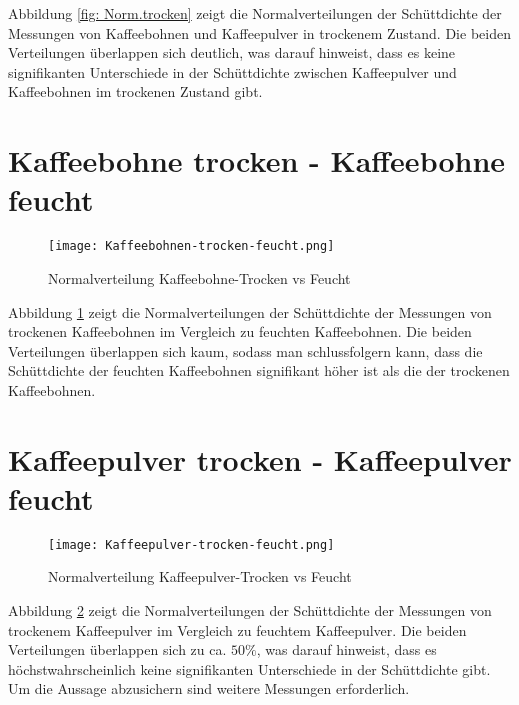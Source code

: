    Abbildung \ref{fig: Norm.trocken} zeigt die Normalverteilungen der Schüttdichte der Messungen von Kaffeebohnen und 
    Kaffeepulver in trockenem Zustand. 
    Die beiden Verteilungen überlappen sich deutlich, was darauf hinweist, dass es keine signifikanten Unterschiede in 
    der Schüttdichte zwischen Kaffeepulver und Kaffeebohnen im trockenen Zustand gibt.

\section{Kaffeebohne trocken - Kaffeebohne feucht}
 \begin{figure}[H]
    \centering
    \texttt{[image: Kaffeebohnen-trocken-feucht.png]}
    \caption{Normalverteilung Kaffeebohne-Trocken vs Feucht}
    \label{fig: Norm.Kaffeebohne-trocken-feucht}
\end{figure}

Abbildung \ref{fig: Norm.Kaffeebohne-trocken-feucht} zeigt die Normalverteilungen der Schüttdichte der Messungen von trockenen 
Kaffeebohnen im Vergleich zu feuchten Kaffeebohnen. 
Die beiden Verteilungen überlappen sich kaum, sodass man schlussfolgern kann, dass die Schüttdichte der feuchten 
Kaffeebohnen signifikant höher ist als die der trockenen Kaffeebohnen.

\section{Kaffeepulver trocken - Kaffeepulver feucht}
 \begin{figure}[H]
    \centering
    \texttt{[image: Kaffeepulver-trocken-feucht.png]}
    \caption{Normalverteilung Kaffeepulver-Trocken vs Feucht}
    \label{fig: Norm.Kaffeepulver-trocken-feucht}
\end{figure}

Abbildung \ref{fig: Norm.Kaffeepulver-trocken-feucht} zeigt die Normalverteilungen der Schüttdichte der Messungen von trockenem 
Kaffeepulver im Vergleich zu feuchtem Kaffeepulver. 
Die beiden Verteilungen überlappen sich zu ca. $50\%$, was darauf hinweist, dass es höchstwahrscheinlich keine signifikanten 
Unterschiede in der Schüttdichte gibt. Um die Aussage abzusichern sind weitere Messungen erforderlich.

